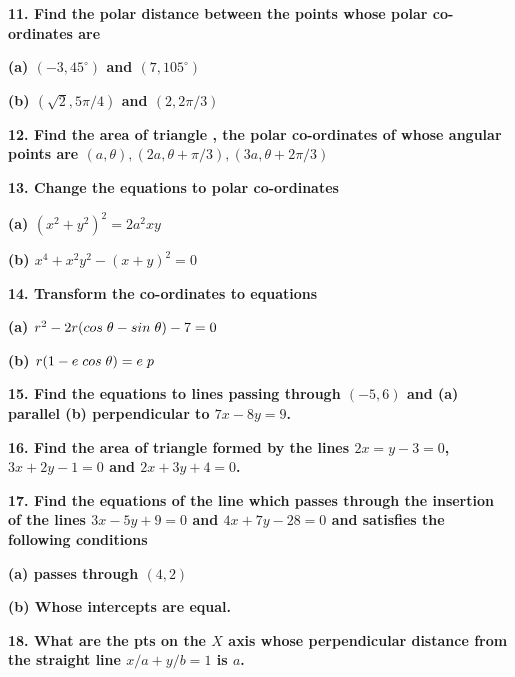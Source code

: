 \documentclass{article}
\begin{document}
\begin{flushleft}
\vspace{0.2cm}
\textbf{11. Find the polar distance between the points whose polar co-ordinates are }\par
\textbf{(a) $(-3, 45^{\circ})$ and $(7, 105^{\circ})$}\par
\textbf{(b) $(\sqrt{2}, 5\pi/4)$ and $(2, 2\pi/3)$}\par
\vspace{0.2cm}
\textbf{12. Find the area of triangle , the polar co-ordinates of whose angular points are $(a , \theta), (2a , \theta+\pi/3), (3a , \theta+2\pi/3)$}\par
\vspace{0.2cm}
\textbf{13. Change the equations to polar co-ordinates}\par
\textbf{(a) $(x^2+y^2)^2 = 2a^2xy$}\par
\textbf{(b) $x^4 + x^2y^2 - (x+y)^2 = 0$}\par
\vspace{0.2cm}
\textbf{14. Transform the co-ordinates to equations}\par
\textbf{(a) $r^2-2r(cos\hspace{0.1cm}\theta-sin\hspace{0.1cm}\theta)-7 = 0$}\par
\textbf{(b) $r(1- e\hspace{0.1cm} cos\hspace{0.1cm}\theta) = e\hspace{0.1cm}p$}\par
\vspace{0.2cm}
\textbf{15. Find the equations to lines passing through $(-5,6)$ and (a) parallel (b) perpendicular to $7x-8y = 9$.}\par
\vspace{0.2cm}
\textbf{16. Find the area of triangle formed by the lines $2x=y-3 = 0$, $3x+2y-1 = 0$ and $2x+3y+4 = 0$.}\par
\vspace{0.2cm}
\textbf{17. Find the equations of the line which passes through the insertion of the lines $3x-5y+9 = 0$ and $4x +7y-28 = 0$ and satisfies the following conditions}\par
\textbf{(a) passes through $(4,2)$}\par
\textbf{(b) Whose intercepts are equal. }\par
\vspace{0.2cm}
\textbf{18. What are the pts on the $X$ axis whose perpendicular distance from the straight line $x/a + y/b = 1$ is $a$. }\par

\end{flushleft}
\end{document}
